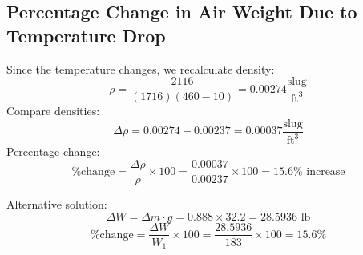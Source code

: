 \documentclass{article}
\begin{document}
\subsection{Percentage Change in Air Weight Due to Temperature Drop}
Since the temperature changes, we recalculate density:
\begin{equation}
    \rho = \frac{2116}{(1716)(460 -10)} = 0.00274 \frac{\text{slug}}{\text{ft}^3}
\end{equation}
Compare densities:
\begin{equation}
    \Delta \rho = 0.00274 - 0.00237 = 0.00037 \frac{\text{slug}}{\text{ft}^3}
\end{equation}
Percentage change:
\begin{equation}
    \% \text{change} = \frac{\Delta \rho}{\rho} \times 100 = \frac{0.00037}{0.00237} \times 100 = 15.6\%\text{ increase}
\end{equation}

Alternative solution:
\begin{equation}
    \Delta W = \Delta m \cdot g = 0.888 \times 32.2 = 28.5936 \text{ lb}
\end{equation}
\begin{equation}
    \% \text{change} = \frac{\Delta W}{W_1} \times 100 = \frac{28.5936}{183} \times 100 = 15.6\%
\end{equation}
\end{document}

